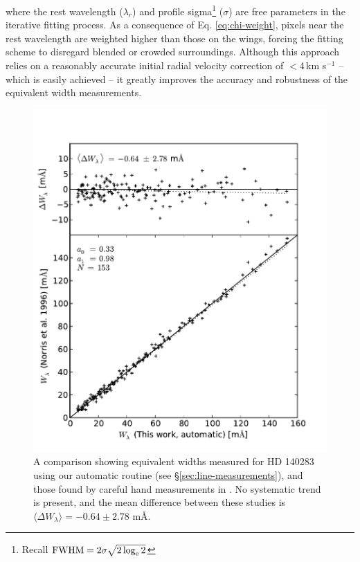 \documentclass{emulateapj}
\begin{document}
\noindent where the rest wavelength ($\lambda_{r}$) and profile sigma\footnote{Recall $\rm{FWHM} = 2\sigma\sqrt{2\log_e{2}}$} ($\sigma$) are free parameters in the iterative fitting process. As a consequence of Eq. \ref{eq:chi-weight}, pixels near the rest wavelength are weighted higher than those on the wings, forcing the fitting scheme to disregard blended or crowded surroundings. Although this approach relies on a reasonably accurate initial radial velocity correction of $<$4\,km s$^{-1}$ \--- which is easily achieved \--- it greatly improves the accuracy and robustness of the equivalent width measurements.

\begin{figure}[h]
	\includegraphics[width=\columnwidth]{./figures/smh-norris.pdf}
	\caption{A comparison showing equivalent widths measured for HD 140283 using our automatic routine (see \S\ref{sec:line-measurements}), and those found by careful hand measurements in \citet{norris;et-al_1996}. No systematic trend is present, and the mean difference between these studies is $\langle\Delta{}W_\lambda\rangle = -0.64 \pm 2.78$ m\AA{}.}
	\label{fig:ew-compare}
\end{figure}
\end{document}
